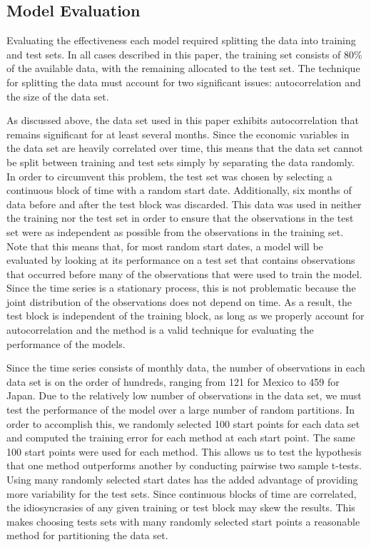 \documentclass{sig-alternate-05-2015}
\begin{document}
\subsection{Model Evaluation}
Evaluating the effectiveness each model required splitting the data into training and test sets. In all cases described in this paper, the training set consists of 80\% of the available data, with the remaining allocated to the test set. The technique for splitting the data must account for two significant issues: autocorrelation and the size of the data set.
\par{} As discussed above, the data set used in this paper exhibits autocorrelation that remains significant for at least several months. Since the economic variables in the data set are heavily correlated over time, this means that the data set cannot be split between training and test sets simply by separating the data randomly. In order to circumvent this problem, the test set was chosen by selecting a continuous block of time with a random start date. Additionally, six months of data before and after the test block was discarded. This data was used in neither the training nor the test set in order to ensure that the observations in the test set were as independent as possible from the observations in the training set. Note that this means that, for most random start dates, a model will be evaluated by looking at its performance on a test set that contains observations that occurred before many of the observations that were used to train the model. Since the time series is a stationary process, this is not problematic because the joint distribution of the observations does not depend on time. As a result, the test block is independent of the training block, as long as we properly account for autocorrelation and the method is a valid technique for evaluating the performance of the models.
\par{} Since the time series consists of monthly data, the number of observations in each data set is on the order of hundreds, ranging from 121 for Mexico to 459 for Japan. Due to the relatively low number of observations in the data set, we must test the performance of the model over a large number of random partitions. In order to accomplish this, we randomly selected 100 start points for each data set and computed the training error for each method at each start point. The same 100 start points were used for each method. This allows us to test the hypothesis that one method outperforms another by conducting pairwise two sample t-tests. Using many randomly selected start dates has the added advantage of providing more variability for the test sets. Since continuous blocks of time are correlated, the idiosyncrasies of any given training or test block may skew the results. This makes choosing tests sets with many randomly selected start points a reasonable method for partitioning the data set.
\end{document}
